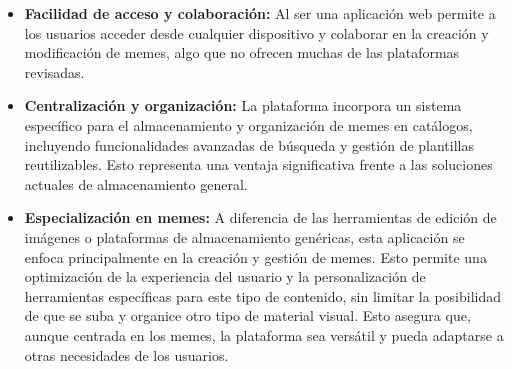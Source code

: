 \begin{itemize}
  \item \textbf{Facilidad de acceso y colaboración:} Al ser una aplicación web permite a los usuarios acceder desde cualquier dispositivo y colaborar en la creación y modificación de memes, algo que no ofrecen muchas de las plataformas revisadas.
  \item \textbf{Centralización y organización:} La plataforma incorpora un sistema específico para el almacenamiento y organización de memes en catálogos, incluyendo funcionalidades avanzadas de búsqueda y gestión de plantillas reutilizables. Esto representa una ventaja significativa frente a las soluciones actuales de almacenamiento general.
  \item \textbf{Especialización en memes:} A diferencia de las herramientas de edición de imágenes o plataformas de almacenamiento genéricas, esta aplicación se enfoca principalmente en la creación y gestión de memes. Esto permite una optimización de la experiencia del usuario y la personalización de herramientas específicas para este tipo de contenido, sin limitar la posibilidad de que se suba y organice otro tipo de material visual. Esto asegura que, aunque centrada en los memes, la plataforma sea versátil y pueda adaptarse a otras necesidades de los usuarios.
\end{itemize}